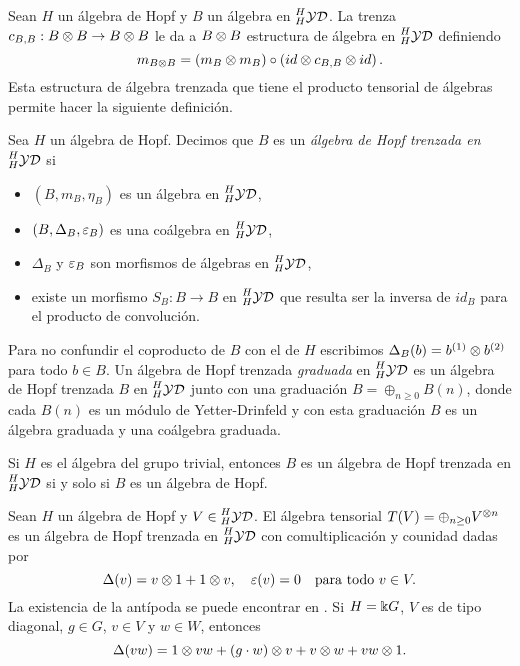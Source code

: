 \documentclass[a4paper,oneside,fleqn,11pt,../tesis.tex]{subfiles}
\newcommand{\yetter}{\prescript{H}{H}{\mathcal{YD}}}
\begin{document}
Sean $H$ un álgebra de Hopf y $B$ un álgebra en $\yetter$.  La trenza $c_{B, B}: B \otimes B \to B \otimes B$ le da a $B \otimes B$ estructura de álgebra en $\yetter$ definiendo
\[
	m_{B \otimes B} = \left(m_B \otimes m_B \right) \circ \left(id \otimes c_{B, B} \otimes id \right).
\]
Esta estructura de álgebra trenzada que tiene el producto tensorial de álgebras permite hacer la siguiente definición.

\begin{definition}
	Sea $H$ un álgebra de Hopf. Decimos que $B$ es un \emph{álgebra de Hopf trenzada en $\yetter$} si
	\begin{itemize}
	\item $\left(B, m_B, \eta_B\right)$ es un álgebra en $\yetter$,
	\item $\left(B, \Delta_B, \varepsilon_B \right)$ es una coálgebra en $\yetter$,
	\item $\Delta_B$ y $\varepsilon_B$ son morfismos de álgebras en $\yetter$,
	\item existe un morfismo $S_B:B \to B$ en $\yetter$ que resulta ser la inversa de $id_B$
	para el producto de convolución.	
	\end{itemize}
	Para no confundir el coproducto de $B$ con el de $H$ escribimos $\Delta_B(b) = b^{(1)}\otimes b^{(2)}$ para todo $b \in B$.
	Un álgebra de Hopf trenzada \emph{graduada} en $\yetter$ es un álgebra de Hopf trenzada $B$ en $\yetter$ junto
	con una graduación $B = \oplus_{n \geq 0}B(n)$, donde cada $B(n)$ es un módulo de Yetter-Drinfeld y con esta 
	graduación $B$ es un álgebra graduada y una coálgebra graduada.
\end{definition}

\begin{example}
	Si $H$ es el álgebra del grupo trivial, entonces $B$ es un álgebra de Hopf trenzada en $\yetter$ si y solo si $B$ es un álgebra de Hopf.
\end{example}

\begin{example} \label{exampletensoralgebra}
	Sean $H$ un álgebra de Hopf y $V \in \yetter$. El álgebra tensorial $T(V) = \oplus_{n \geq 0}V^{\otimes n}$ es un álgebra de Hopf trenzada en $\yetter$
	con comultiplicación y counidad dadas por
	\[
		\Delta(v) = v \otimes 1 + 1 \otimes v, \quad \varepsilon(v) = 0 \quad\text{para todo } v \in V.	
	\]
	La existencia de la antípoda se puede encontrar en . Si $H = \Bbbk G$, $V$ es de tipo diagonal, $g \in G$, $v \in V$ y
	$w \in W$, entonces
	\[
		\Delta(vw) = 1 \otimes vw + (g \cdot w) \otimes v + v \otimes w + vw \otimes 1.
	\]
\end{example}
\end{document}
